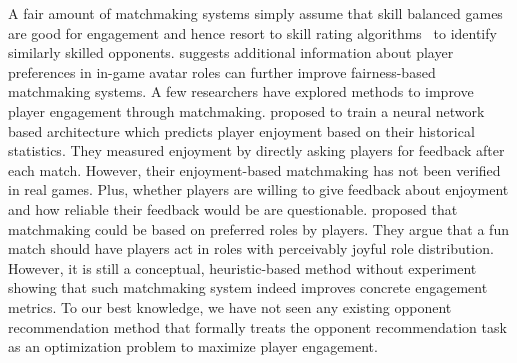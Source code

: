 A fair amount of matchmaking systems simply assume that skill balanced games are good for engagement \citep{graepel2006ranking,sweetser2005gameflow,flow1990psychology,chen2007flow} and hence resort to skill rating algorithms~\citep{glickman1999parameter,elo1978rating,herbrich:trueskill} to identify similarly skilled opponents. \textcite{myslak2014developing} suggests additional information about player preferences in in-game avatar roles can further improve fairness-based matchmaking systems. A few researchers have explored methods to improve player engagement through matchmaking. \textcite{Delalleau2012} proposed to train a neural network based architecture which predicts player enjoyment based on their historical statistics. They measured enjoyment by directly asking players for feedback after each match. However, their enjoyment-based matchmaking has not been verified in real games. Plus, whether players are willing to give feedback about enjoyment and how reliable their feedback would be are questionable. \textcite{jimenez2011matchmaking} proposed that matchmaking could be based on preferred roles by players. They argue that a fun match should have players act in  roles with perceivably joyful role distribution. However, it is still a conceptual, heuristic-based method without experiment showing that such matchmaking system indeed improves concrete engagement metrics. To our best knowledge, we have not seen any existing opponent recommendation method that formally treats the opponent recommendation task as an optimization problem to maximize player engagement. 








